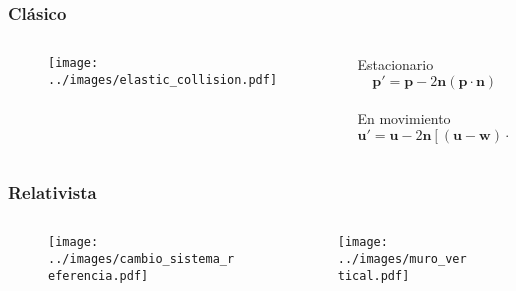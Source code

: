 \documentclass{beamer}
\begin{document}
\begin{frame}
    \frametitle[prueb1]{Clásico}
    \begin{columns}
        \begin{column}{0.5\textwidth}
            \begin{figure}
                \centering
                \texttt{[image: ../images/elastic\_collision.pdf]}
            \end{figure}         
        \end{column}
        \begin{column}{0.5\textwidth}
            \centering
            Estacionario
            \begin{equation*}
                \mathbf{p}' = \mathbf{p} - 2\mathbf{n}(\mathbf{p} \cdot \mathbf{n})
            \end{equation*}\\
            \vspace{1cm}
            En movimiento
            \begin{equation*}
               \mathbf{u}' = \mathbf{u} - 2\mathbf{n}\left[(\mathbf{u} - \mathbf{w}) \cdot \mathbf{n}\right]
            \end{equation*}
        \end{column}
    \end{columns}
\end{frame}

\begin{frame}
    \frametitle[prueb1]{Relativista}
    \begin{columns}
        \begin{column}{0.5\textwidth}
            \begin{figure}
                \centering
                \texttt{[image: ../images/cambio\_sistema\_referencia.pdf]}
            \end{figure}         
        \end{column}
        \hspace{1cm}
        \begin{column}{0.5\textwidth}
            \begin{figure}[H]
                \centering
                \texttt{[image: ../images/muro\_vertical.pdf]}
            \end{figure}
        \end{column}
    \end{columns}
\end{frame}
\end{document}

